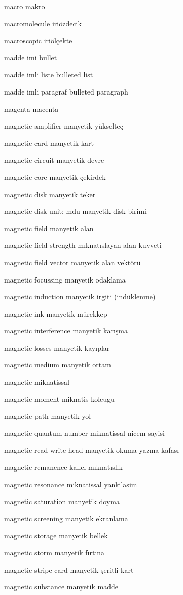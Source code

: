 \documentclass[12pt,fleqn]{article}\usepackage{../../common}
\begin{document}
macro makro

macromolecule iriözdecik

macroscopic iriölçekte

madde imi bullet

madde imli liste bulleted list

madde imli paragraf bulleted paragraph

magenta macenta

magnetic amplifier manyetik yükselteç

magnetic card manyetik kart

magnetic circuit manyetik devre

magnetic core manyetik çekirdek

magnetic disk manyetik teker

magnetic disk unit; mdu manyetik disk birimi

magnetic field manyetik alan

magnetic field strength mıknatıslayan alan kuvveti

magnetic field vector manyetik alan vektörü

magnetic focussing manyetik odaklama

magnetic induction manyetik irgiti (indüklenme)

magnetic ink manyetik mürekkep

magnetic interference manyetik karışma

magnetic losses manyetik kayıplar

magnetic medium manyetik ortam

magnetic miknatissal

magnetic moment miknatis kolcugu

magnetic path manyetik yol

magnetic quantum number miknatissal nicem sayisi

magnetic read-write head manyetik okuma-yazma kafası

magnetic remanence kalıcı mıknatıslık

magnetic resonance miknatissal yankilasim

magnetic saturation manyetik doyma

magnetic screening manyetik ekranlama

magnetic storage manyetik bellek

magnetic storm manyetik fırtına

magnetic stripe card manyetik şeritli kart

magnetic substance manyetik madde
\end{document}
